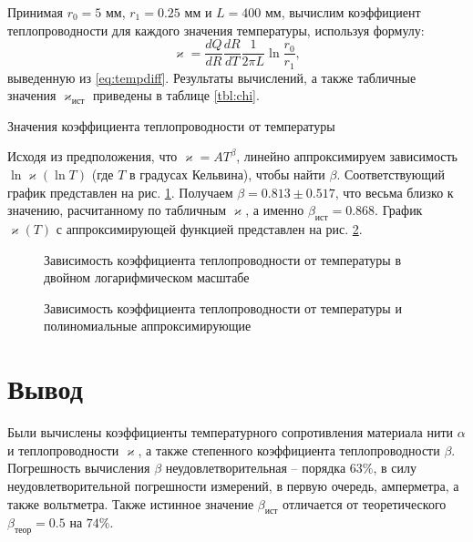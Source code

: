 \documentclass[a4paper,12pt]{article}
\begin{document}
  Принимая $r_0 = 5$ мм, $r_1 = 0.25$ мм и $L = 400$ мм, вычислим коэффициент теплопроводности для каждого значения температуры, используя формулу:
  \begin{equation}
    \varkappa = \frac{dQ}{dR} \frac{dR}{dT} \frac{1}{2 \pi L} \ln \frac{r_0}{r_1},
  \end{equation}
  выведенную из \eqref{eq:tempdiff}. Результаты вычислений, а также табличные значения $\varkappa_{ист}$ приведены в таблице \ref{tbl:chi}.

  \begin{table}[!htb]
    \centering
    
    \caption{Значения коэффициента теплопроводности от температуры}
    \label{tbl:chi}
  \end{table}

  Исходя из предположения, что $\varkappa = A T^\beta$, линейно аппроксимируем зависимость $\ln \varkappa (\ln T)$ (где $T$ в градусах Кельвина), чтобы найти $\beta$. Соответствующий график представлен на рис. \ref{fig:ln_chi}. Получаем $\beta = 0.813 \pm 0.517$, что весьма близко к значению, расчитанному по табличным $\varkappa$, а именно $\beta_{ист} = 0.868$. График $ \varkappa (T)$ с аппроксимирующей функцией представлен на рис. \ref{fig:chi}.

  \begin{figure}[!htb]
    \centering
    
    \caption{Зависимость коэффициента теплопроводности от температуры в двойном логарифмическом масштабе}
    \label{fig:ln_chi}
  \end{figure}

  \begin{figure}[!htb]
    \centering
    
    \caption{Зависимость коэффициента теплопроводности от температуры и полиномиальные аппроксимирующие}
    \label{fig:chi}
  \end{figure}

\section{Вывод}

  Были вычислены коэффициенты температурного сопротивления материала нити $\alpha$ и теплопроводности $\varkappa$, а также степенного коэффициента теплопроводности $\beta$. Погрешность вычисления $\beta$ неудовлетворительная -- порядка $63\%$, в силу неудовлетворительной погрешности измерений, в первую очередь, амперметра, а также вольтметра. Также истинное значение $\beta_{ист}$ отличается от теоретического $\beta_{теор} = 0.5$ на $74\%$.
\end{document}
